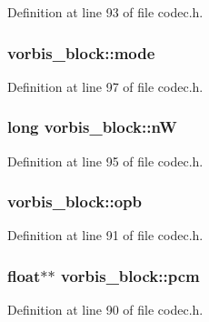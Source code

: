 Definition at line 93 of file codec.\+h.

\subsubsection[{\texorpdfstring{mode}{mode}}]{ vorbis\+\_\+block\+::mode}\hypertarget{structvorbis__block_adab44bb8520c9d5daafee3f1a1bcf538}{}\label{structvorbis__block_adab44bb8520c9d5daafee3f1a1bcf538}


Definition at line 97 of file codec.\+h.

\subsubsection[{\texorpdfstring{nW}{nW}}]{\setlength{\rightskip}{0pt plus 5cm}long vorbis\+\_\+block\+::nW}\hypertarget{structvorbis__block_a6fa002c8c36ad39c1c015cfa673dda28}{}\label{structvorbis__block_a6fa002c8c36ad39c1c015cfa673dda28}


Definition at line 95 of file codec.\+h.

\subsubsection[{\texorpdfstring{opb}{opb}}]{ vorbis\+\_\+block\+::opb}\hypertarget{structvorbis__block_a43f1746974a729fa4e835ef995f9782a}{}\label{structvorbis__block_a43f1746974a729fa4e835ef995f9782a}


Definition at line 91 of file codec.\+h.

\subsubsection[{\texorpdfstring{pcm}{pcm}}]{\setlength{\rightskip}{0pt plus 5cm}float$\ast$$\ast$ vorbis\+\_\+block\+::pcm}\hypertarget{structvorbis__block_ac8312d70a6e63afc01d3df8a54ac6508}{}\label{structvorbis__block_ac8312d70a6e63afc01d3df8a54ac6508}


Definition at line 90 of file codec.\+h.

